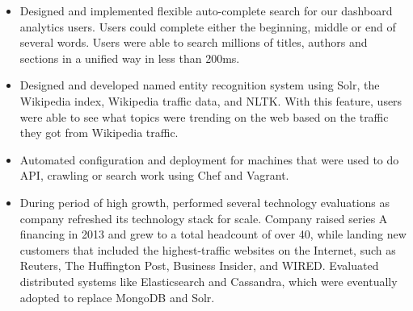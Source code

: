 \documentclass[8pt,letterpaper,final]{moderncv}
\begin{document}
{\begin{itemize}
          analytics pipeline that processes hundreds of millions of events per
          day. The pipeline powers the Parse.ly's Dash analytics
          product.    
        \item Designed and implemented flexible auto-complete search for our
            dashboard analytics users. Users could complete either the
            beginning, middle or end of 
            several words. Users were
            able to search millions of titles, authors and sections in
            a unified way  in less than 200ms. 
        \item Designed and developed named entity recognition system using Solr, 
          the Wikipedia index, Wikipedia traffic data, and NLTK. With
          this feature, users were able to see what topics were
          trending on the web based on the traffic they got from
          Wikipedia traffic.
        \item Automated  configuration and deployment for machines
          that were used to do API, crawling or search work using Chef
          and Vagrant.
          \item During period of high growth, performed several
            technology evaluations as company refreshed its technology
            stack for scale. Company raised series A financing in 2013
            and grew to a total headcount of over 40, while landing
            new customers that included the highest-traffic websites
            on the Internet, such as Reuters, The Huffington Post,
            Business Insider, and WIRED. Evaluated distributed systems
            like Elasticsearch and Cassandra, which were eventually
            adopted to replace MongoDB and Solr. 
      \end{itemize}
  }
\end{document}
